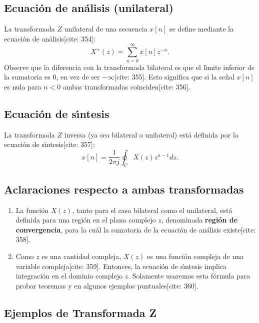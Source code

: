 \subsection{Ecuaci\'{o}n de an\'{a}lisis (unilateral)}
La transformada $Z$ unilateral de una secuencia $x[n]$ se define mediante la ecuaci\'{o}n de an\'{a}lisis[cite: 354]:
\begin{equation}
	X^{+}(z) = \sum_{n=0}^{\infty} x[n] z^{-n}.
\end{equation}
Observe que la diferencia con la transformada bilateral es que el l\'{\i}mite inferior de la sumatoria es $0$, en vez de ser $-\infty$[cite: 355]. Esto significa que si la se\~{n}al $x[n]$ es nula para $n < 0$ ambas transformadas coinciden[cite: 356].

\subsection{Ecuaci\'{o}n de s\'{\i}ntesis}
La transformada $Z$ inversa (ya sea bilateral o unilateral) est\'{a} definida por la ecuaci\'{o}n de s\'{\i}ntesis[cite: 357]:
\begin{equation}
	x[n] = \frac{1}{2\pi j} \oint_{C} X(z) z^{n-1} dz.
\end{equation}

\subsection{Aclaraciones respecto a ambas transformadas}

\begin{enumerate}
	\item La funci\'{o}n $X(z)$, tanto para el caso bilateral como el unilateral, est\'{a} definida para una regi\'{o}n en el plano complejo $z$, denominada \textbf{regi\'{o}n de convergencia}, para la cu\'{a}l la sumatoria de la ecuaci\'{o}n de an\'{a}lisis existe[cite: 358].
	\item Como $z$ es una cantidad compleja, $X(z)$ es una funci\'{o}n compleja de una variable compleja[cite: 359]. Entonces, la ecuaci\'{o}n de s\'{\i}ntesis implica integraci\'{o}n en el dominio complejo $z$. Solamente usaremos esta f\'{o}rmula para probar teoremas y en algunos ejemplos puntuales[cite: 360].
\end{enumerate}

\subsection{Ejemplos de Transformada Z} \label{zetaejemplouno}

